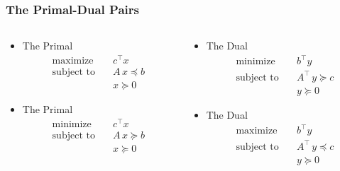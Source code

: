 \documentclass[usenames,dvipsnames,8pt]{beamer}%
\begin{document}
\begin{frame}
  \frametitle{The Primal-Dual Pairs}
  \begin{columns}
    \begin{column}{0.5\textwidth}
      \begin{itemize}
        \item The Primal  
          \begin{align*}
            \text{maximize}  \quad& c^\top x \\
            \text{subject to}\quad& A\,x \preccurlyeq b\\
                                  & x\succcurlyeq 0
          \end{align*}
        \item The Primal  
          \begin{align*}
            \text{minimize}  \quad& c^\top x \\
            \text{subject to}\quad& A\,x \succcurlyeq b\\
                                  & x\succcurlyeq 0
          \end{align*}
      \end{itemize}
    \end{column}
    \hspace{-7mm}
    \begin{column}{0.5\textwidth}
      \begin{itemize}
        \item The Dual 
          \begin{align*}
            \text{minimize}  \quad& b^\top y \\
            \text{subject to}\quad& A^\top\,y \succcurlyeq c\\
                                  & y\succcurlyeq 0
          \end{align*}
        \item The Dual 
          \begin{align*}
            \text{maximize}  \quad& b^\top y \\
            \text{subject to}\quad& A^\top\,y \preccurlyeq c\\
                                  & y\succcurlyeq 0
          \end{align*}
      \end{itemize}
    \end{column}
  \end{columns}
\end{frame}
\end{document}
